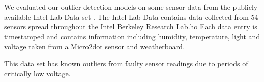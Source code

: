 
We evaluated our outlier detection models on some sensor data from the publicly available Intel Lab Data set \cite{IntelLabData}.
The Intel Lab Data contains data collected from 54 sensors spread throughout the Intel Berkeley Research Lab.ho
Each data entry is timestamped and contains information including humidity, temperature, light and voltage taken from a Micro2dot sensor and weatherboard.

This data set has known outliers from faulty sensor readings due to periods of critically low voltage.
